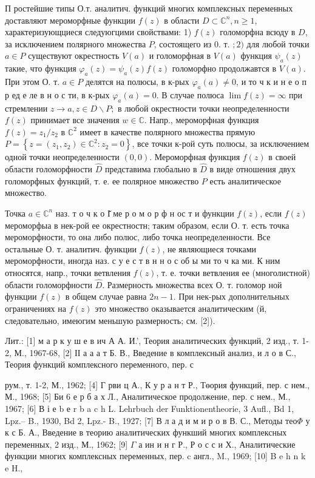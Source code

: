 \documentclass[10pt]{article}
\begin{document}
П ростейшие типы О.т. аналитич. функций многих комплексных переменных доставляют мероморфные функции $f(z)$ в области $D \subset \mathbb{C}^{n}, n \geqslant 1$, характеризующциеся следуюгцими свойствами: 1) $f(z)$ голоморфна всюду в $D$, за исключением полярного множества $P$, состоящего из 0. т. $; 2)$ для любой точки $a \in P$ существуют окрестность $V(a)$ и голоморфная в $V(a)$ функция $\psi_{a}(z)$ такие, что функция $\varphi_{a}(z)=\psi_{a}(z) f(z)$ голоморфно продолжавтся в $V(a)$. При этом О. т. $a \in P$ делятся на полюсы, в к-рых $\varphi_{a}(a) \neq 0$, и то ч к и н е о п р ед е ле в н о с ти, в к-рых $\varphi_{a}(a)=0$. В случае полюса $\lim f(z)=\infty$ при стремлении $z \rightarrow a, z \in D \backslash P ;$ в любой окрестности точки неопределенности $f(z)$ принимает все значения $w \in \mathbb{C}$. Напр., мероморфная функция $f(z)=z_{1} / z_{2}$ в $\mathbb{C}^{2}$ имеет в качестве полярного множества прямую $P=\left\{z=\left(z_{1}, z_{2}\right) \in \mathbb{C}^{2}: z_{2}=0\right\}$, все точки к-рой суть полюсы, за исключением одной точки неопределенности $(0,0)$. Мероморфная функция $f(z)$ в своей области голоморфности $\hat{D}$ представима глобально в $\hat{D}$ в виде отношения двух голоморфных функций, т. е. ее полярное множество $P$ есть аналитическое множество.



Точка $a \in \mathbb{C}^{n}$ наз. т о ч к о І̆ ме р о м о р ф н ос т и функции $f(z)$, если $f(z)$ мероморфыа в нек-рой ее окрестностн; таким образом, если О. т. есть точка мероморфности, то она либо полюс, либо точка неопределенности. Все остальные О. т. аналитич. функции $f(z)$, не являющиеся точками мероморфности, иногда наз. с у е с т в н н о с об ы ми то ч ка ми. К ним относятся, напр., точки ветвления $f(z)$, т. е. точки ветвления ее (многолистной) области голоморфности $\hat{D}$. Размерность множества всех О. т. голомор ной функции $f(z)$ в общем случае равна $2 n-1$. При нек-рых дополнительных ограничениях на $f(z)$ это множество оказывается аналитическим (й, следовательно, имеюгим меньшую размерность; см. [2]).



Лит.: [1] м а р к у ш е в ич А А. И.', Теория аналитических функций, 2 изд., т. 1-2, М., 1967-68, [2] ІІ а а а т Б. В., Введение в комплексный анализ, и л о в С., Теория функций комплексного переменного, пер. с

рум., т. 1-2, М., 1962; [4] Г рви ц А., К у р а н т Р., Төория функций, пер. с нем., М., 1968; [5] Би 6 е р б а х Л., Аналитическое продолжение, пер. с нем., М., 1967; [6] В і е b е r b a c h L. Lehrbuch der Funktionentheorie, 3 Aufl., Bd 1, Lpz.-- B., 1930, Bd 2, Lpz.- B., 1927; [7] В л а д и м и р о в В. С., Методы тео$\Phi$ у к с Б. А., Введение в теорию аналитических функший многих комплексных переменных, 2 изд., М., 1962; [9] $\Gamma$ а ин и н г Р., Р о с с и Х., Аналитические функции многих комплексных переменных, пер. c англ., M., 1969; [10] B e h n k e H.,
\end{document}
